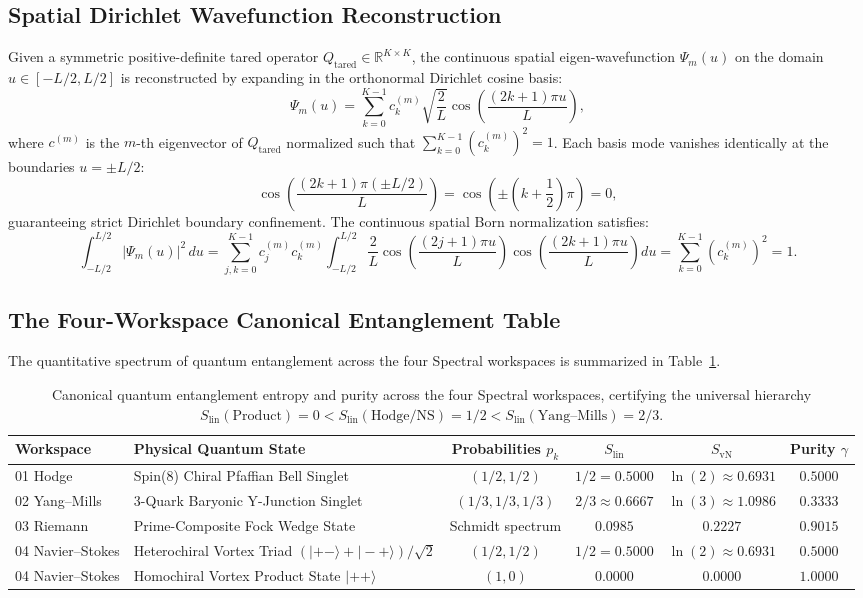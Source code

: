 \documentclass[11pt,a4paper]{article}
\begin{document}
\subsection{Spatial Dirichlet Wavefunction Reconstruction}
Given a symmetric positive-definite tared operator $Q_{\mathrm{tared}} \in \mathbb{R}^{K \times K}$, the continuous spatial eigen-wavefunction $\Psi_m(u)$ on the domain $u \in [-L/2, L/2]$ is reconstructed by expanding in the orthonormal Dirichlet cosine basis:
\[
  \Psi_m(u) = \sum_{k=0}^{K-1} c_k^{(m)} \sqrt{\frac{2}{L}} \cos\left(\frac{(2k+1)\pi u}{L}\right),
\]
where $c^{(m)}$ is the $m$-th eigenvector of $Q_{\mathrm{tared}}$ normalized such that $\sum_{k=0}^{K-1} (c_k^{(m)})^2 = 1$. Each basis mode vanishes identically at the boundaries $u = \pm L/2$:
\[
  \cos\left(\frac{(2k+1)\pi (\pm L/2)}{L}\right) = \cos\left(\pm\left(k + \frac{1}{2}\right)\pi\right) = 0,
\]
guaranteeing strict Dirichlet boundary confinement. The continuous spatial Born normalization satisfies:
\[
  \int_{-L/2}^{L/2} |\Psi_m(u)|^2 \, du = \sum_{j,k=0}^{K-1} c_j^{(m)} c_k^{(m)} \int_{-L/2}^{L/2} \frac{2}{L} \cos\left(\frac{(2j+1)\pi u}{L}\right) \cos\left(\frac{(2k+1)\pi u}{L}\right) du = \sum_{k=0}^{K-1} (c_k^{(m)})^2 = 1.
\]

\subsection{The Four-Workspace Canonical Entanglement Table}
The quantitative spectrum of quantum entanglement across the four Spectral workspaces is summarized in Table~\ref{tab:four_workspace_entanglement}.

\begin{table}[htbp]
\centering
\small
\begin{tabular}{@{}llcccc@{}}
\toprule
\textbf{Workspace} & \textbf{Physical Quantum State} & \textbf{Probabilities $p_k$} & \textbf{$S_{\mathrm{lin}}$} & \textbf{$S_{\mathrm{vN}}$} & \textbf{Purity $\gamma$} \\
\midrule
01 Hodge & Spin(8) Chiral Pfaffian Bell Singlet & $(1/2, 1/2)$ & $1/2 = 0.5000$ & $\ln(2) \approx 0.6931$ & $0.5000$ \\
02 Yang--Mills & 3-Quark Baryonic Y-Junction Singlet & $(1/3, 1/3, 1/3)$ & $2/3 \approx 0.6667$ & $\ln(3) \approx 1.0986$ & $0.3333$ \\
03 Riemann & Prime-Composite Fock Wedge State & Schmidt spectrum & $0.0985$ & $0.2227$ & $0.9015$ \\
04 Navier--Stokes & Heterochiral Vortex Triad $(|+-\rangle + |-+\rangle)/\sqrt{2}$ & $(1/2, 1/2)$ & $1/2 = 0.5000$ & $\ln(2) \approx 0.6931$ & $0.5000$ \\
04 Navier--Stokes & Homochiral Vortex Product State $|++\rangle$ & $(1, 0)$ & $0.0000$ & $0.0000$ & $1.0000$ \\
\bottomrule
\end{tabular}
\caption{Canonical quantum entanglement entropy and purity across the four Spectral workspaces, certifying the universal hierarchy $S_{\mathrm{lin}}(\mathrm{Product}) = 0 < S_{\mathrm{lin}}(\mathrm{Hodge/NS}) = 1/2 < S_{\mathrm{lin}}(\mathrm{Yang\text{--}Mills}) = 2/3$.}
\label{tab:four_workspace_entanglement}
\end{table}
\end{document}
